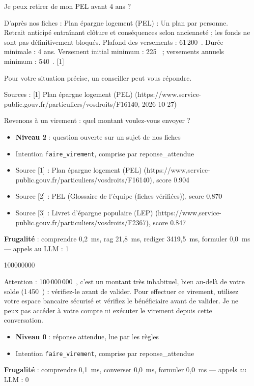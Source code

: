 \documentclass[11pt,a4paper]{article}
\newcommand{\frugal}[1]{{\scriptsize\color{darkgray}\textbf{Frugalité} : #1}\par\medskip}
\begin{document}
\begin{client}Je peux retirer de mon PEL avant 4 ans ?\end{client}
\begin{assistant}D'après nos fiches : Plan épargne logement (PEL) : Un plan par personne. Retrait anticipé entraînant clôture et conséquences selon ancienneté ; les fonds ne sont pas définitivement bloqués. Plafond des versements : 61\,200~\texteuro{}. Durée minimale : 4 ans. Versement initial minimum : 225~\texteuro{} ; versements annuels minimum : 540~\texteuro{}. [1]\par Pour votre situation précise, un conseiller peut vous répondre.\par Sources : [1] Plan épargne logement (PEL) (https://www.service-public.gouv.fr/particuliers/vosdroits/F16140, 2026-10-27)\par Revenons à un virement : quel montant voulez-vous envoyer ?\end{assistant}
\begin{pourquoi}
\begin{itemize}
\item \textbf{Niveau 2} : question ouverte sur un sujet de nos fiches
\item Intention \texttt{faire\_virement}, comprise par reponse\_attendue
\item Source [1] : Plan épargne logement (PEL) (https://www,service-public.gouv.fr/particuliers/vosdroits/F16140), score 0.904
\item Source [2] : PEL (Glossaire de l'équipe (fiches vérifiées)), score 0,870
\item Source [3] : Livret d'épargne populaire (LEP) (https://www,service-public.gouv.fr/particuliers/vosdroits/F2367), score 0.847
\end{itemize}
\end{pourquoi}
\frugal{comprendre 0,2~ms, rag 21,8~ms, rediger 3419,5~ms, formuler 0,0~ms --- appels au LLM : 1}

\begin{client}100000000\end{client}
\begin{assistant}Attention : 100\,000\,000~\texteuro{}, c'est un montant très inhabituel, bien au-delà de votre solde (1\,450~\texteuro{}) : vérifiez-le avant de valider. Pour effectuer ce virement, utilisez votre espace bancaire sécurisé et vérifiez le bénéficiaire avant de valider. Je ne peux pas accéder à votre compte ni exécuter le virement depuis cette conversation.\end{assistant}
\begin{pourquoi}
\begin{itemize}
\item \textbf{Niveau 0} : réponse attendue, lue par les règles
\item Intention \texttt{faire\_virement}, comprise par reponse\_attendue
\end{itemize}
\end{pourquoi}
\frugal{comprendre 0,1~ms, converser 0,0~ms, formuler 0,0~ms --- appels au LLM : 0}
\end{document}
